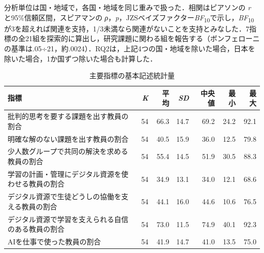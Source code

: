 \documentclass[a4paper,10pt,twocolumn]{ltjsarticle}
\begin{document}
分析単位は国・地域で，各国・地域を同じ重みで扱った．相関はピアソンの \textit{r} と95\%信頼区間，スピアマンの \textit{ρ}，\textit{p}，JZSベイズファクター\textit{BF}\textsubscript{10}で示し，\textit{BF}\textsubscript{10}が3を超えれば関連を支持，1/3未満なら関連がないことを支持とみなした．7指標の全21組を探索的に算出し，研究課題に関わる組を報告する（ボンフェローニの基準は.05÷21，約.0024）．RQ2は，上記4つの国・地域を除いた場合，日本を除いた場合，1か国ずつ除いた場合も計算した．
\begin{table}[!t]
\caption{主要指標の基本記述統計量}
\centering\small
\begin{tabular}{>{\raggedright\arraybackslash}p{9.2cm}rrrrrr}
\toprule
指標 & \textit{K} & 平均 & \textit{SD} & 中央値 & 最小 & 最大 \\
\midrule
批判的思考を要する課題を出す教員の割合 & 54 & 66.3 & 14.7 & 69.2 & 24.2 & 92.1 \\
明確な解のない課題を出す教員の割合 & 54 & 40.5 & 15.9 & 36.0 & 12.5 & 79.8 \\
少人数グループで共同の解決を求める教員の割合 & 54 & 55.4 & 14.5 & 51.9 & 30.5 & 88.3 \\
学習の計画・管理にデジタル資源を使わせる教員の割合 & 54 & 34.9 & 13.1 & 34.0 & 12.1 & 68.6 \\
デジタル資源で生徒どうしの協働を支える教員の割合 & 54 & 44.1 & 16.0 & 44.6 & 10.6 & 76.5 \\
デジタル資源で学習を支えられる自信のある教員の割合 & 54 & 73.0 & 11.5 & 74.9 & 40.1 & 92.3 \\
AIを仕事で使った教員の割合 & 54 & 41.9 & 14.7 & 41.0 & 13.5 & 75.0 \\
\bottomrule
\end{tabular}
\par{}
\end{table}
\end{document}
